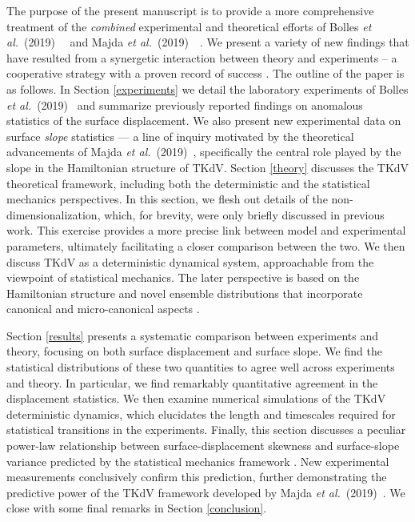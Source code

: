 \documentclass[11pt]{article}
\newcommand{\boetal}{Bolles {\it et al.}~(2019)~}
\newcommand{\maetal}{Majda {\it et al.}~(2019)~}
\begin{document}
The purpose of the present manuscript is to provide a more comprehensive treatment of the {\em combined} experimental and theoretical efforts of \boetal~\cite{bolles2019} and \maetal~\cite{majda2019, majdaqi2019}. We present a variety of new findings that have resulted from a synergetic interaction between theory and experiments -- a cooperative strategy with a proven record of success \cite{camassa2012stratified, ristroph2012, ganedi2018equilibrium}. 
The outline of the paper is as follows. In Section \ref{experiments} we detail the laboratory experiments of \boetal \cite{bolles2019} and summarize previously reported findings on anomalous statistics of the surface displacement. We also present new experimental data on surface {\em slope} statistics --- a line of inquiry motivated by the theoretical advancements of \maetal \cite{majda2019}, specifically the central role played by the slope in the Hamiltonian structure of TKdV.  Section \ref{theory} discusses the TKdV theoretical framework, including both the deterministic and the statistical mechanics perspectives. In this section, we flesh out details of the non-dimensionalization, which, for brevity, were only briefly discussed in previous work. This exercise provides a more precise link between model and experimental parameters, ultimately facilitating a closer comparison between the two. We then discuss TKdV as a deterministic dynamical system, approachable from the viewpoint of statistical mechanics. The later perspective is based on the Hamiltonian structure and novel ensemble distributions that incorporate canonical and micro-canonical aspects \cite{abramov2003}. 

Section \ref{results} presents a systematic comparison between experiments and theory, focusing on both surface displacement and surface slope. We find the statistical distributions of these two quantities to agree well across experiments and theory. In particular, we find remarkably quantitative agreement in the displacement statistics. We then examine numerical simulations of the TKdV deterministic dynamics, which elucidates the length and timescales required for statistical transitions in the experiments. Finally, this section discusses a peculiar power-law relationship between surface-displacement skewness and surface-slope variance predicted by the statistical mechanics framework \cite{majda2019}. New experimental measurements conclusively confirm this prediction, further demonstrating the predictive power of the TKdV framework developed by \maetal \cite{majda2019}. We close with some final remarks in Section \ref{conclusion}.
\end{document}
